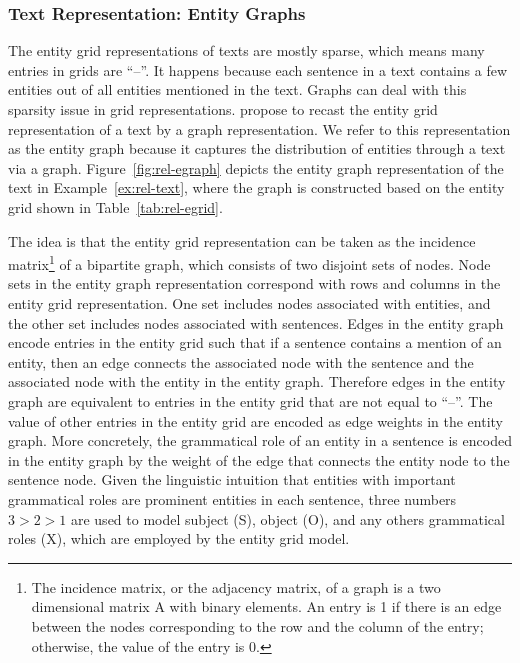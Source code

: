 \subsubsection{Text Representation: Entity Graphs}

The entity grid representations of texts are mostly sparse, which means many entries in grids are ``--''.
It happens because each sentence in a text contains a few entities out of all entities mentioned in the text. 
Graphs can deal with this sparsity issue in grid representations. 
 propose to recast the entity grid representation of a text by a graph representation. 
We refer to this representation as the entity graph because it captures the distribution of entities through a text via a graph. 
Figure~\ref{fig:rel-egraph} depicts the entity graph representation of the text in Example~\ref{ex:rel-text}, where the graph is constructed based on the entity grid shown in Table~\ref{tab:rel-egrid}. 

The idea is that the entity grid representation can be taken as the incidence matrix\footnote{The incidence matrix, or the adjacency matrix, of a graph is a two dimensional matrix A with binary elements. An entry is 1 if there is an edge between the nodes corresponding to the row and the column of the entry; otherwise, the value of the entry is 0.} 
of a bipartite graph, which consists of two disjoint sets of nodes.  
Node sets in the entity graph representation correspond with rows and columns in the entity grid representation.  
One set includes nodes associated with entities, and the other set includes nodes associated with sentences.  
Edges in the entity graph encode entries in the entity grid such that if a sentence contains a mention of an entity, then an edge connects the associated node with the sentence and the associated node with the entity in the entity graph. 
Therefore edges in the entity graph are equivalent to entries in the entity grid that are not equal to ``--''. 
The value of other entries in the entity grid are encoded as edge weights in the entity graph. 
More concretely, the grammatical role of an entity in a sentence is encoded in the entity graph by the weight of the edge that connects the entity node to the sentence node. 
Given the linguistic intuition that entities with important grammatical roles are prominent entities in each sentence, three numbers $3>2>1$ are used to model subject (S), object (O), and any others grammatical roles (X), which are employed by the entity grid model. 

